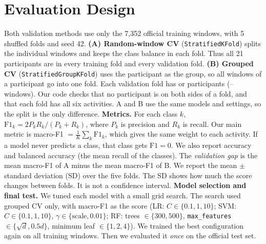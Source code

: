 \documentclass{article}
\begin{document}
\section{Evaluation Design}
Both validation methods use only the 7,352 official training windows, with 5 shuffled folds and seed 42. \textbf{(A) Random-window CV} (\texttt{StratifiedKFold}) splits the individual windows and keeps the class balance in each fold. Thus all 21 participants are in every training fold and every validation fold.
\textbf{(B) Grouped CV} (\texttt{StratifiedGroupKFold}) uses the participant as the group, so all windows of a participant go into one fold. Each validation fold has \Ngrpvalsubjmin{} or \Ngrpvalsubjmax{} participants (\Ngrpnvalmin{}--\Ngrpnvalmax{} windows). Our code checks that no participant is on both sides of a fold, and that each fold has all six activities.
A and B use the same models and settings, so the split is the only difference.
\textbf{Metrics.} For each class $k$, $\mathrm{F1}_k=2P_kR_k/(P_k+R_k)$, where $P_k$ is precision and $R_k$ is recall. Our main metric is macro-F1 $=\frac1K\sum_k\mathrm{F1}_k$, which gives the same weight to each activity. If a model never predicts a class, that class gets $\mathrm{F1}=0$. We also report accuracy and balanced accuracy (the mean recall of the classes). The \emph{validation gap} is the mean macro-F1 of A minus the mean macro-F1 of B. We report the mean $\pm$ standard deviation (SD) over the five folds. The SD shows how much the score changes between folds. It is not a confidence interval.
\textbf{Model selection and final test.} We tuned each model with a small grid search. The search used grouped CV only, with macro-F1 as the score (LR: $C\in\{0.1,1,10\}$; SVM: $C\in\{0.1,1,10\}$, $\gamma\in\{\text{scale},0.01\}$; RF: trees $\in\{300,500\}$, \texttt{max\_features} $\in\{\sqrt d,0.5d\}$, minimum leaf $\in\{1,2,4\}$). We trained the best configuration again on all training windows. Then we evaluated it \emph{once} on the official test set.
\end{document}
